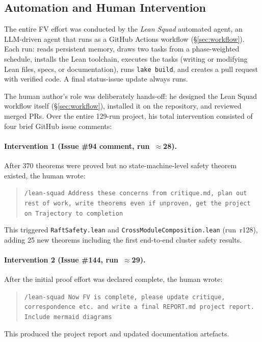 \documentclass[sigconf,10pt]{acmart}
\begin{document}
\subsection{Automation and Human Intervention}
\label{sec:interventions}

The entire FV effort was conducted by the \emph{Lean Squad} automated
agent, an LLM-driven agent that runs as a GitHub Actions workflow
(\S\ref{sec:workflow}).
Each run: reads persistent memory, draws two tasks from a phase-weighted
schedule, installs the Lean toolchain, executes the tasks (writing or
modifying Lean files, specs, or documentation), runs \texttt{lake build},
and creates a pull request with verified code.  A final status-issue
update always runs.

The human author's role was deliberately hands-off: he designed the
Lean Squad workflow itself (\S\ref{sec:workflow}), installed it on the
repository, and reviewed merged PRs.  Over the entire 129-run project,
his total intervention consisted of four brief GitHub issue comments:

\paragraph{Intervention 1 (Issue \#94 comment, run~$\approx$28).}
After 370 theorems were proved but no state-machine-level safety
theorem existed, the human wrote:
\begin{quote}\small
\texttt{/lean-squad Address these concerns from critique.md,
plan out rest of work, write theorems even if unproven,
get the project on Trajectory to completion}
\end{quote}
This triggered \texttt{RaftSafety.lean} and
\texttt{CrossModuleComposition.lean} (run~r128), adding 25 new
theorems including the first end-to-end cluster safety results.

\paragraph{Intervention 2 (Issue \#144, run~$\approx$29).}
After the initial proof effort was declared complete, the human wrote:
\begin{quote}\small
\texttt{/lean-squad Now FV is complete, please update critique,
correspondence etc.\ and write a final REPORT.md project report.
Include mermaid diagrams}
\end{quote}
This produced the project report and updated documentation artefacts.
\end{document}
